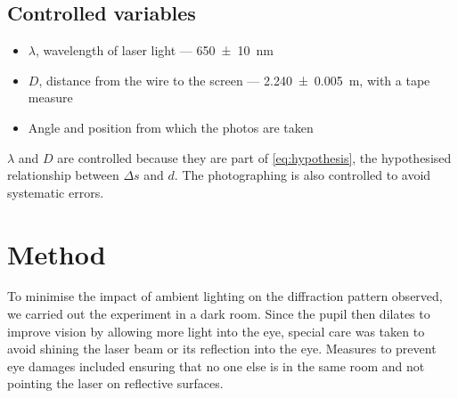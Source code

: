 \documentclass[a4paper, 12pt]{article}
\begin{document}
\subsection*{Controlled variables}
\begin{itemize}
\itemsep 0em
    \item $\lambda$, wavelength of laser light --- \SI{650+-10}{\nm} \autocite{laser-specs}
    \item $D$, distance from the wire to the screen --- \SI{2.240+-0.005}{\m}, with a tape measure
    \item Angle and position from which the photos are taken
\end{itemize}
$\lambda$ and $D$ are controlled because they are part of \cref{eq:hypothesis}, the hypothesised relationship between $\Delta s$ and $d$. 
The photographing is also controlled to avoid systematic errors.

\section{Method}
To minimise the impact of ambient lighting on the diffraction pattern observed, we carried out the experiment in a dark room. 
Since the pupil then dilates to improve vision by allowing more light into the eye, special care was taken to avoid shining the laser beam or its reflection into the eye. 
Measures to prevent eye damages included ensuring that no one else is in the same room and not pointing the laser on reflective surfaces.
\end{document}

